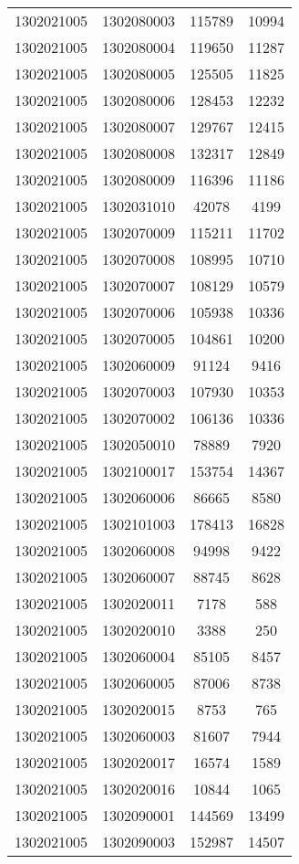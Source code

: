 \begin{longtable}{llcc}
1302021005 & 1302080003 & 115789 & 10994\\
1302021005 & 1302080004 & 119650 & 11287\\
1302021005 & 1302080005 & 125505 & 11825\\
1302021005 & 1302080006 & 128453 & 12232\\
1302021005 & 1302080007 & 129767 & 12415\\
1302021005 & 1302080008 & 132317 & 12849\\
1302021005 & 1302080009 & 116396 & 11186\\
1302021005 & 1302031010 & 42078 & 4199\\
1302021005 & 1302070009 & 115211 & 11702\\
1302021005 & 1302070008 & 108995 & 10710\\
1302021005 & 1302070007 & 108129 & 10579\\
1302021005 & 1302070006 & 105938 & 10336\\
1302021005 & 1302070005 & 104861 & 10200\\
1302021005 & 1302060009 & 91124 & 9416\\
1302021005 & 1302070003 & 107930 & 10353\\
1302021005 & 1302070002 & 106136 & 10336\\
1302021005 & 1302050010 & 78889 & 7920\\
1302021005 & 1302100017 & 153754 & 14367\\
1302021005 & 1302060006 & 86665 & 8580\\
1302021005 & 1302101003 & 178413 & 16828\\
1302021005 & 1302060008 & 94998 & 9422\\
1302021005 & 1302060007 & 88745 & 8628\\
1302021005 & 1302020011 & 7178 & 588\\
1302021005 & 1302020010 & 3388 & 250\\
1302021005 & 1302060004 & 85105 & 8457\\
1302021005 & 1302060005 & 87006 & 8738\\
1302021005 & 1302020015 & 8753 & 765\\
1302021005 & 1302060003 & 81607 & 7944\\
1302021005 & 1302020017 & 16574 & 1589\\
1302021005 & 1302020016 & 10844 & 1065\\
1302021005 & 1302090001 & 144569 & 13499\\
1302021005 & 1302090003 & 152987 & 14507\\

\end{longtable}
